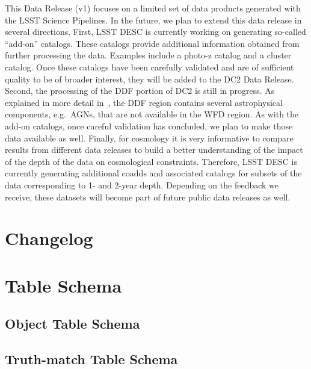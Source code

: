 \documentclass[modern]{descnote}
\begin{document}
This Data Release (v1) focuses on a limited set of data products generated with the LSST Science Pipelines. In the future, we plan to extend this data release in several directions. First, LSST DESC is currently working on generating so-called ``add-on'' catalogs. These catalogs provide additional information obtained from further processing the data. Examples include a photo-z catalog and a cluster catalog. Once these catalogs have been carefully validated and are of sufficient quality to be of broader interest, they will be added to the DC2 Data Release. Second, the processing of the DDF portion of DC2 is still in progress. As explained in more detail in~\cite{2020arXiv201005926L}, the DDF region contains several astrophysical components, e.g.~AGNs, that are not available in the WFD region. As with the add-on catalogs, once careful validation has concluded, we plan to make those data available as well. Finally, for cosmology it is very informative to compare results from different data releases to build a better understanding of the impact of the depth of the data on cosmological constraints. Therefore, LSST DESC is currently generating additional coadds and associated catalogs for subsets of the data corresponding to 1- and 2-year depth. Depending on the feedback we receive, these datasets will become part of future public data releases as well.


\clearpage
\appendix
\section{Changelog}


\clearpage

\section{Table Schema}

\subsection{Object Table Schema}
\label{app:object-schema}


\bigskip

\subsection{Truth-match Table Schema}
\label{app:truth-schema}

\end{document}
